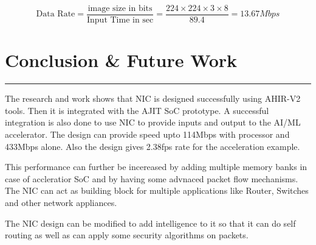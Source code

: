 \documentclass[12pt]{report}
\begin{document}
	\begin{center}

		\begin{equation}\label{eqn:datarate}
			\text{Data Rate} = \frac {\text{image size in bits}} {\text{Input Time in sec}} = \frac{224\times224\times3\times8}{89.4} = 13.67 	Mbps
		\end{equation}
	\end{center}


\newpage
\chapter{Conclusion \& Future Work} \label{4}
\rule[10pt]{\linewidth}{3pt}	

	The research and work shows that NIC is designed successfully using AHIR-V2 tools. Then it is integrated with the AJIT SoC prototype. A successful integration is also done to use NIC to provide inputs and output to the AI/ML accelerator. The design can provide speed upto 114Mbps with processor and 433Mbps alone. Also the design gives 2.38fps rate for the acceleration example.
	
	This performance can further be incereased by adding multiple memory banks in case of accleratior SoC and by having some advnaced packet flow mechanisms. The NIC can act as building block for multiple applications like Router, Switches and other network appliances.
	
	The NIC design can be modified to add intelligence to it so that it can do self routing as well as can apply some security algorithms on packets.



%
%
\clearpage


\end{document}
